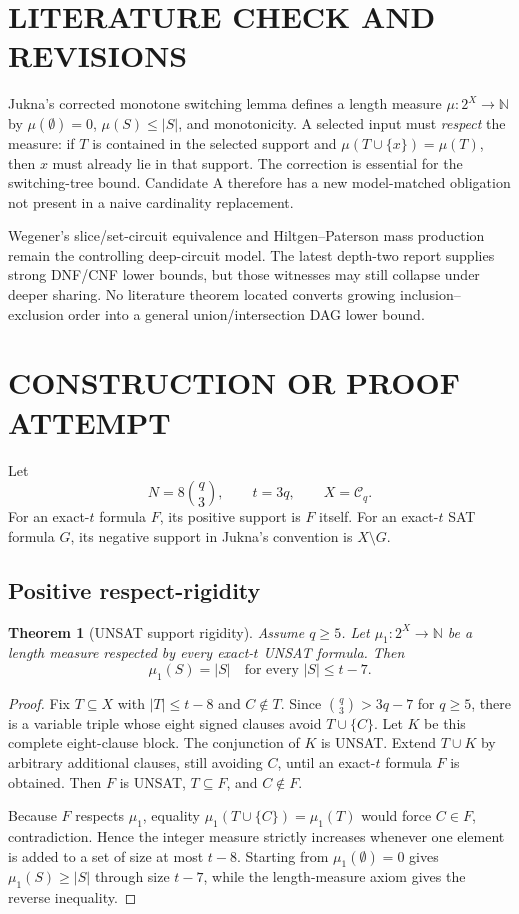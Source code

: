 \documentclass[11pt]{article}
\newtheorem{theorem}{Theorem}
\begin{document}
\section{LITERATURE CHECK AND REVISIONS}
Jukna's corrected monotone switching lemma defines a length measure $\mu:2^X\to\mathbb N$ by $\mu(\emptyset)=0$, $\mu(S)\le |S|$, and monotonicity. A selected input must \emph{respect} the measure: if $T$ is contained in the selected support and $\mu(T\cup\{x\})=\mu(T)$, then $x$ must already lie in that support. The correction is essential for the switching-tree bound. Candidate A therefore has a new model-matched obligation not present in a naive cardinality replacement.

Wegener's slice/set-circuit equivalence and Hiltgen--Paterson mass production remain the controlling deep-circuit model. The latest depth-two report supplies strong DNF/CNF lower bounds, but those witnesses may still collapse under deeper sharing. No literature theorem located converts growing inclusion--exclusion order into a general union/intersection DAG lower bound.

\section{CONSTRUCTION OR PROOF ATTEMPT}
Let
\[N=8\binom q3,\qquad t=3q,\qquad X=\mathcal C_q.\]
For an exact-$t$ formula $F$, its positive support is $F$ itself. For an exact-$t$ SAT formula $G$, its negative support in Jukna's convention is $X\setminus G$.

\subsection{Positive respect-rigidity}
\begin{theorem}[UNSAT support rigidity]
Assume $q\ge5$. Let $\mu_1:2^X\to\mathbb N$ be a length measure respected by every exact-$t$ UNSAT formula. Then
\[\boxed{\mu_1(S)=|S|\quad\text{for every }|S|\le t-7.}\]
\end{theorem}
\begin{proof}
Fix $T\subseteq X$ with $|T|\le t-8$ and $C\notin T$. Since $\binom q3>3q-7$ for $q\ge5$, there is a variable triple whose eight signed clauses avoid $T\cup\{C\}$. Let $K$ be this complete eight-clause block. The conjunction of $K$ is UNSAT. Extend $T\cup K$ by arbitrary additional clauses, still avoiding $C$, until an exact-$t$ formula $F$ is obtained. Then $F$ is UNSAT, $T\subseteq F$, and $C\notin F$.

Because $F$ respects $\mu_1$, equality $\mu_1(T\cup\{C\})=\mu_1(T)$ would force $C\in F$, contradiction. Hence the integer measure strictly increases whenever one element is added to a set of size at most $t-8$. Starting from $\mu_1(\emptyset)=0$ gives $\mu_1(S)\ge|S|$ through size $t-7$, while the length-measure axiom gives the reverse inequality.
\end{proof}
\end{document}
